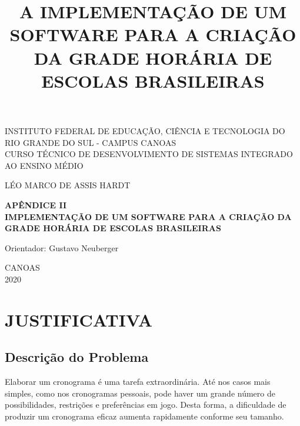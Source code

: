 \documentclass[12pt,a4paper]{article}
\title{A IMPLEMENTAÇÃO DE UM SOFTWARE PARA A CRIAÇÃO DA GRADE HORÁRIA DE ESCOLAS BRASILEIRAS}
\newenvironment{bottompar}{\par\vspace*{\fill}}{\clearpage}
\begin{document}
		\thispagestyle{empty}

		\begin{center}
			INSTITUTO FEDERAL DE EDUCAÇÃO, CIÊNCIA E TECNOLOGIA DO RIO GRANDE DO SUL - CAMPUS CANOAS \\
			CURSO TÉCNICO DE DESENVOLVIMENTO DE SISTEMAS INTEGRADO AO ENSINO MÉDIO\\
		\end{center}

		\vskip 3cm

		\begin{center}
			LÉO MARCO DE ASSIS HARDT
		\end{center}

		\vskip 3cm

		\begin{center}
			\textbf{APÊNDICE II\\IMPLEMENTAÇÃO DE UM SOFTWARE PARA A CRIAÇÃO DA GRADE HORÁRIA DE ESCOLAS BRASILEIRAS}
		\end{center}

		\vskip 3cm

		\begin{center}
			Orientador: Gustavo Neuberger
		\end{center}

		\begin{bottompar}
			\begin{center}
			CANOAS \\
			2020
			\end{center}
		\end{bottompar}

    \section{JUSTIFICATIVA}

		\subsection{Descrição do Problema}

			\par Elaborar um cronograma é uma tarefa extraordinária. Até nos casos mais simples, como nos cronogramas pessoais, pode haver um grande número de possibilidades, restrições e preferências em jogo. Desta forma, a dificuldade de produzir um cronograma eficaz aumenta rapidamente conforme seu tamanho.
\end{document}
